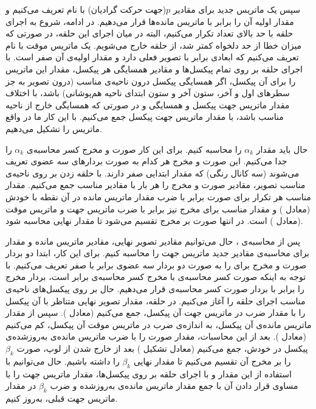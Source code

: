 سپس یک ماتریس جدید برای مقادیر $p$‌(جهت حرکت گرادیان) با نام  تعریف می‌کنیم و مقدار اولیه آن را برابر با ماتریس مانده‌ها قرار می‌دهیم. در ادامه، شروع به اجرای حلقه با حد بالای تعداد تکرار می‌کنیم، البته در میان اجرای این حلقه، در صورتی که میزان خطا از حد دلخواه کمتر شد، از حلقه خارج می‌شویم. یک ماتریس موقت با نام  تعریف می‌کنیم که ابعادی برابر با تصویر فعلی دارد و مقدار اولیه‌ی آن صفر است. با اجرای حلقه بر روی تمام پیکسل‌ها و مقادیر همسایگی هر پیکسل، مقدار این ماتریس را برای آن پیکسل، اگر همسایگی پیکسل درون ناحیه‌ی مناسب (درون تصویر به جز سطر‌های اول و آخر، ستون آخر و ستون ابتدای ناحیه هم‌پوشانی) باشد، با اختلاف مقدار ماتریس جهت پیکسل و همسایگی و در صورتی که همسایگی خارج از ناحیه مناسب باشد، با مقدار ماتریس جهت پیکسل جمع می‌کنیم. با این کار ما در واقع ماتریس  را تشکیل می‌دهیم.

حال باید مقدار $\alpha_k$ را محاسبه کنیم. برای این کار صورت و مخرج کسر محاسبه‌ی $\alpha_k$ را جدا می‌کنیم. این صورت و مخرج هر کدام به صورت بردار‌های سه عضوی تعریف می‌شوند (سه کانال رنگی) که مقدار ابتدایی صفر دارند. با حلقه زدن بر روی ناحیه‌ی مناسب تصویر، مقادیر صورت و مخرج را هر بار با مقادیر مناسب جمع می‌کنیم. مقدار مناسب هر تکرار برای صورت برابر با ضرب مقدار ماتریس مانده در آن نقطه با خودش (معادل ) و مقدار مناسب برای مخرج نیز برابر با ضرب ماتریس جهت و ماتریس موقت  (معادل ) است. در انتها صورت بر مخرج تقسیم می‌شود تا مقدار نهایی  محاسبه شود.

پس از محاسبه‌ی ، حال می‌توانیم مقادیر تصویر نهایی، مقادیر ماتریس مانده و مقدار  برای محاسبه‌ی مقادیر جدید ماتریس جهت را محاسبه کنیم. برای این کار، ابتدا دو بردار صورت و مخرج برای  را به صورت دو بردار سه عضوی برابر با صفر تعریف می‌کنیم. با توجه به اینکه صورت کسر محاسبه‌ی  با مخرج کسر محاسبه‌ی  برابر است، بردار مخرج را برابر با بردار صورت کسر محاسبه‌ی  قرار می‌دهیم. حال بر روی پیکسل‌های ناحیه‌ی مناسب اجرای حلقه را آغاز می‌کنیم. در حلقه، مقدار تصویر نهایی متناظر با آن پیکسل را با مقدار  ضرب در ماتریس جهت آن پیکسل، جمع می‌کنیم (معادل ). سپس از مقدار ماتریس مانده‌ی آن پیکسل، به اندازه‌ی  ضرب در ماتریس موقت آن پیکسل، کم می‌کنیم (معادل ). بعد از این محاسبات، مقدار صورت  را با ضرب ماتریس مانده‌ی به‌روز‌شده‌ی پیکسل در خودش، جمع می‌کنیم (معادل تشکیل ) بعد از خارج شدن از لوپ، صورت $\beta_k$ را بر مخرج آن تقسیم می‌کنیم تا مقدار نهایی $\beta_k$ را داشته باشیم. حال می‌توانیم با استفاده از این مقدار و با اجرای حلقه بر روی پیکسل‌ها، مقدار ماتریس جهت را با مساوی قرار دادن آن با جمع مقدار ماتریس مانده‌ی به‌روز‌شده و ضرب $\beta_k$ در مقدار ماتریس جهت قبلی، به‌روز‌ کنیم. 

